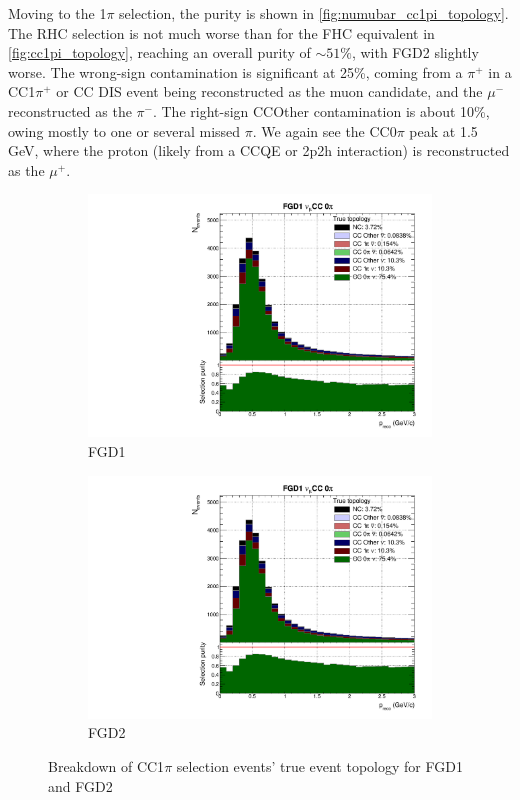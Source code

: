 Moving to the 1$\pi$ \numubar selection, the purity is shown in \autoref{fig:numubar_cc1pi_topology}. The \numubar RHC selection is not much worse than for the \numu FHC equivalent in \autoref{fig:cc1pi_topology}, reaching an overall purity of $\sim 51\%$, with FGD2 slightly worse. The wrong-sign contamination is significant at 25\%, coming from a $\pi^+$ in a CC1$\pi^+$ or CC DIS event being reconstructed as the muon candidate, and the $\mu^-$ reconstructed as the $\pi^-$. The right-sign CCOther contamination is about 10\%, owing mostly to one or several missed $\pi$. We again see the CC0$\pi$ \numu peak at 1.5 GeV, where the proton (likely from a CCQE or 2p2h interaction) is reconstructed as the $\mu^+$.
\begin{figure}[h]
	\begin{subfigure}[t]{0.49\textwidth}
		\includegraphics[width=\textwidth,page=15, trim={0mm 0mm 0mm 9mm}, clip]{figures/mach3/2018/Selection/2018_FullNoRedNDmatrix_rebin_verbose_may_diagnostics}
		\caption{FGD1}
	\end{subfigure}
	\begin{subfigure}[t]{0.49\textwidth}
		\includegraphics[width=\textwidth,page=21, trim={0mm 0mm 0mm 9mm}, clip]{figures/mach3/2018/Selection/2018_FullNoRedNDmatrix_rebin_verbose_may_diagnostics}
		\caption{FGD2}
	\end{subfigure}
	\caption{Breakdown of \numubar CC1$\pi$ selection events' true event topology for FGD1 and FGD2 }
	\label{fig:numubar_cc1pi_topology}
\end{figure}

